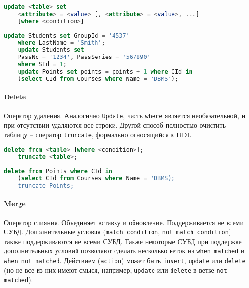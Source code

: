 \begin{lstlisting}[language=SQL]
    update <table> set
    <attribute> = <value> [, <attribute> = <value>, ...]
    [where <condition>]
\end{lstlisting}

\begin{examples}
	\enewline
	\begin{lstlisting}[language=SQL]
    update Students set GroupId = '4537'
    where LastName = 'Smith';
    update Students set
    PassNo = '1234', PassSeries = '567890'
    where SId = 1;
    update Points set points = points + 1 where CId in
    (select CId from Courses where Name = 'DBMS');
    \end{lstlisting}
\end{examples}

\paragraph{Delete}

Оператор удаления. Аналогично \texttt{Update}, часть \texttt{where} является
необязательной, и при отсутствии удаляются все строки. Другой способ полностью очистить таблицу --
оператор \texttt{truncate}, формально относящийся к DDL.

\begin{lstlisting}[language=SQL]
    delete from <table> [where <condition>];
    truncate <table>;
\end{lstlisting}

\begin{examples}
	\enewline
	\begin{lstlisting}[language=SQL]
    delete from Points where CId in
    (select CId from Courses where Name = 'DBMS);
    truncate Points;
    \end{lstlisting}
\end{examples}

\paragraph{Merge}

Оператор слияния. Объединяет вставку и обновление. Поддерживается не всеми СУБД. Дополнительные
условия (\texttt{match condition}, \texttt{not match condition}) также поддерживаются не всеми СУБД. Также
некоторые СУБД при поддержке дополнительных условий позволяют сделать несколько веток на
\texttt{when matched} и \texttt{when not matched}. Действием (\texttt{action}) может быть
\texttt{insert}, \texttt{update} или \texttt{delete} (но не все из них имеют смысл, например,
\texttt{update} или \texttt{delete} в ветке \texttt{not matched}).

